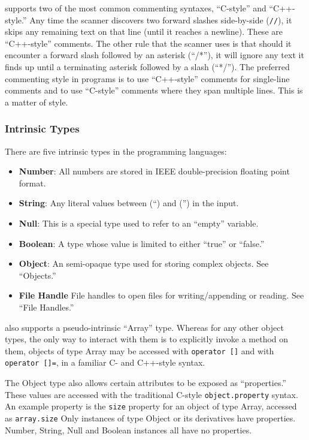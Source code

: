 \ModLang supports two of the most common commenting syntaxes, ``C-style''
and ``C++-style.'' Any time the scanner discovers two forward slashes
side-by-side ({\tt //}), it skips any remaining text on that line
(until it reaches a newline). These are ``C++-style'' comments. The other
rule that the scanner uses is that should it encounter a forward slash
followed by an asterisk (``/*''), it will ignore any text it finds up
until a terminating asterisk followed by a slash (``*/''). The preferred
commenting style in \ModLang programs is to use ``C++-style'' comments
for single-line comments and to use ``C-style'' comments where they
span multiple lines. This is a matter of style.

\subsubsection{Intrinsic Types}

There are five intrinsic types in the \ModLang programming languages:

\begin{itemize}
\item \textbf{Number}: All numbers are stored in IEEE double-precision floating point format.
\item \textbf{String}: Any literal values between (``) and ('') in the input.
\item \textbf{Null}: This is a special type used to refer to an ``empty'' variable.
\item \textbf{Boolean}: A type whose value is limited to either ``true'' or ``false.''
\item \textbf{Object}: An semi-opaque type used for storing complex objects. See ``Objects.''
\item \textbf{File Handle} File handles to open files for writing/appending or reading. See ``File Handles.''
\end{itemize}

\ModLang also supports a pseudo-intrinsic ``Array'' type. Whereas for any other
object types, the only way to interact with them is to explicitly invoke a
method on them, objects of type Array may be accessed with {\tt operator []}
and with {\tt operator []=}, in a familiar C- and C++-style syntax.

The Object type also allows certain attributes to be exposed as ``properties.''
These values are accessed with the traditional C-style {\tt object.property}
syntax. An example property is the {\tt size} property for an object of
type Array, accessed as {\tt array.size} Only instances of type Object
or its derivatives have properties. Number, String, Null and Boolean
instances all have no properties.

